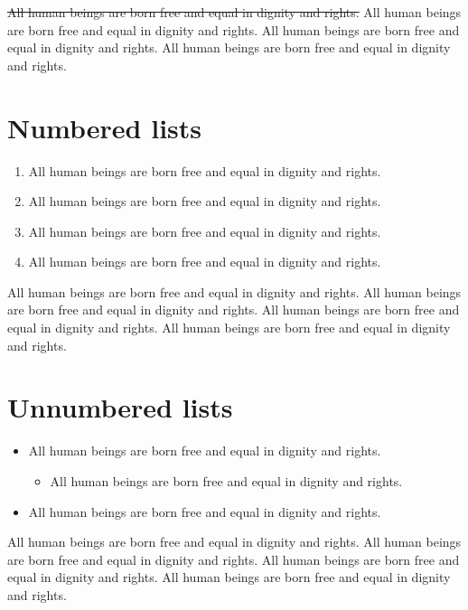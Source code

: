 \documentclass[
  ngerman,
  american,
  titlepage,
  openright,
  DIV=calc,
  toc=listof,
  listof=nochaptergap]{scrbook}
\providecommand{\tightlist}{%
  \setlength{\itemsep}{0pt}\setlength{\parskip}{0pt}}
\begin{document}
\st{All human beings are born free and equal in dignity and rights.} All
human beings are born free and equal in dignity and rights. All human
beings are born free and equal in dignity and rights. All human beings
are born free and equal in dignity and rights.

\section{Numbered lists}\label{numbered-lists}

\begin{enumerate}
\def\labelenumi{\arabic{enumi}.}
\tightlist
\item
  All human beings are born free and equal in dignity and rights.
\item
  All human beings are born free and equal in dignity and rights.
\item
  All human beings are born free and equal in dignity and rights.
\item
  All human beings are born free and equal in dignity and rights.
\end{enumerate}

All human beings are born free and equal in dignity and rights. All
human beings are born free and equal in dignity and rights. All human
beings are born free and equal in dignity and rights. All human beings
are born free and equal in dignity and rights.

\section{Unnumbered lists}\label{unnumbered-lists}

\begin{itemize}
\tightlist
\item
  All human beings are born free and equal in dignity and rights.

  \begin{itemize}
  \tightlist
  \item
    All human beings are born free and equal in dignity and rights.
  \end{itemize}
\item
  All human beings are born free and equal in dignity and rights.
\end{itemize}

All human beings are born free and equal in dignity and rights. All
human beings are born free and equal in dignity and rights. All human
beings are born free and equal in dignity and rights. All human beings
are born free and equal in dignity and rights.
\end{document}
